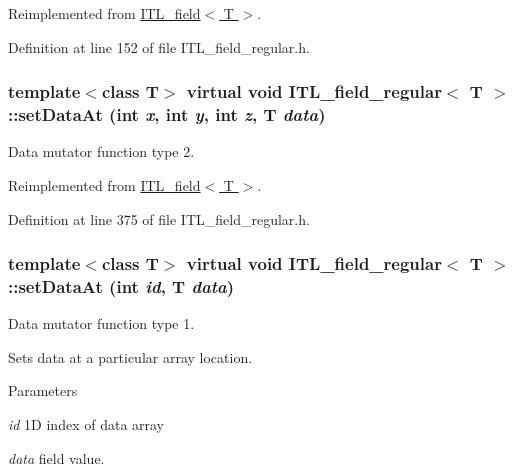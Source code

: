Reimplemented from \hyperlink{classITL__field_a7bf82ed82a338d34985a6758307c8ece}{ITL\_\-field$<$ T $>$}.



Definition at line 152 of file ITL\_\-field\_\-regular.h.

\hypertarget{classITL__field__regular_a38fef3e9ec1551e58d217dcb29bcbc4b}{
\subsubsection[{setDataAt}]{\setlength{\rightskip}{0pt plus 5cm}template$<$class T$>$ virtual void {\bf ITL\_\-field\_\-regular}$<$ T $>$::setDataAt (int {\em x}, \/  int {\em y}, \/  int {\em z}, \/  T {\em data})}}
\label{classITL__field__regular_a38fef3e9ec1551e58d217dcb29bcbc4b}


Data mutator function type 2. 



Reimplemented from \hyperlink{classITL__field_aeea532e25732eb1582a937409a98d05e}{ITL\_\-field$<$ T $>$}.



Definition at line 375 of file ITL\_\-field\_\-regular.h.

\hypertarget{classITL__field__regular_a201a4f3e6b1a0ff6654f2bfbb40f516d}{
\subsubsection[{setDataAt}]{\setlength{\rightskip}{0pt plus 5cm}template$<$class T$>$ virtual void {\bf ITL\_\-field\_\-regular}$<$ T $>$::setDataAt (int {\em id}, \/  T {\em data})}}
\label{classITL__field__regular_a201a4f3e6b1a0ff6654f2bfbb40f516d}


Data mutator function type 1. 

Sets data at a particular array location. 
\begin{DoxyParams}{Parameters}
\item[{\em id}]1D index of data array \item[{\em data}]field value. \end{DoxyParams}


